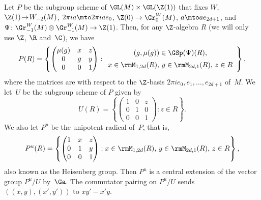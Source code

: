Let $P$ be the subgroup scheme of $\GL(M)\times\GL(\Z(1))$ that fixes
$W$, $\Z(1)\!\to\! W_{-2}(M)$, $2\pi i a\mto 2\pi i ae_0$,
$\Z(0)\to\Gr^W_0(M)$, $a\mto ae_{2d+1}$, and $\Psi\colon
\Gr^W_{-1}(M)\otimes \Gr^W_{-1}(M)\to\Z(1)$. Then, for any
$\Z$-algebra $R$ (we will only use $\Z$, $\R$ and~$\C$), we have
\begin{equation}
\label{eq:def_P}
P(R) =
\left\{
\begin{pmatrix}
\mu(g) & x & z\\
0 & g & y\\
0 & 0 & 1
\end{pmatrix} :
\begin{array}{c}
\text{$(g,\mu(g))\in\GSp(\Psi)(R)$,}\\[5pt]
\text{$x\in\rmM_{1,2d}(R)$, $y\in\rmM_{2d,1}(R)$, $z\in R$}
\end{array}
\right\},
\end{equation}
where the matrices are with respect to the $\Z$-basis $2\pi ie_0,
e_1,\ldots,e_{2d+1}$ of~$M$. We let~$U$ be the subgroup scheme of $P$
given by
\[
U(R) =
\left\{
\begin{pmatrix}
1 & 0 & z\\
0 & 1 & 0\\
0 & 0 & 1
\end{pmatrix} :
\text{$z\in R$}
\right\}.
\]
We also let $P^u$ be the
unipotent radical of~$P$, that is,
\[
P^u(R) =
\left\{
\begin{pmatrix}
1 & x & z\\
0 & 1 & y\\
0 & 0 & 1
\end{pmatrix} :
\text{$x\in\rmM_{1,2d}(R)$, $y\in\rmM_{2d,1}(R)$, $z\in R$}
\right\},
\]
also known as the Heisenberg group.
Then $P^u$ is a central extension of the vector group $P^u/U$
by~$\Ga$. The commutator pairing on $P^u/U$ sends
$((x,y),(x',y'))$ to $xy'-x'y$.

